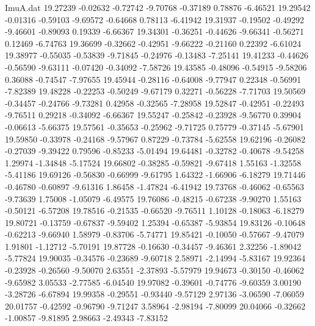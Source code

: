 \begin{filecontents}{ImuA.dat}
  19.27239   -0.02632   -0.72742   -9.70768   -0.37189    0.78876   -6.46521
  19.29542   -0.01316   -0.59103   -9.69572   -0.64668    0.78113   -6.41942
  19.31937   -0.19502   -0.49292   -9.46601   -0.89093    0.19339   -6.66367
  19.34301   -0.36251   -0.44626   -9.66341   -0.56271    0.12469   -6.74763
  19.36699   -0.32662   -0.42951   -9.66222   -0.21160    0.22392   -6.61024
  19.38977   -0.55035   -0.53839   -9.71845   -0.24976   -0.13483   -7.25141
  19.41233   -0.44626   -0.56590   -9.63111   -0.07420   -0.34092   -7.58726
  19.43585   -0.48096   -0.54915   -9.58206    0.36088   -0.74547   -7.97655
  19.45944   -0.28116   -0.64008   -9.77947    0.22348   -0.56991   -7.82389
  19.48228   -0.22253   -0.50249   -9.67179    0.32271   -0.56228   -7.71703
  19.50569   -0.34457   -0.24766   -9.73281    0.42958   -0.32565   -7.28958
  19.52847   -0.42951   -0.22493   -9.76511    0.29218   -0.34092   -6.66367
  19.55247   -0.25842   -0.23928   -9.56770    0.39904   -0.06613   -5.66375
  19.57561   -0.35653   -0.25962   -9.71725    0.75779   -0.37145   -5.67901
  19.59850   -0.33978   -0.24168   -9.57967    0.87229   -0.73784   -5.62558
  19.62196   -0.26082   -0.27039   -9.39422    0.79596   -0.85233   -5.01494
  19.64481   -0.32782   -0.40678   -9.54258    1.29974   -1.34848   -5.17524
  19.66802   -0.38285   -0.59821   -9.67418    1.55163   -1.32558   -5.41186
  19.69126   -0.56830   -0.66999   -9.61795    1.64322   -1.66906   -6.18279
  19.71446   -0.46780   -0.60897   -9.61316    1.86458   -1.47824   -6.41942
  19.73768   -0.46062   -0.65563   -9.73639    1.75008   -1.05079   -6.49575
  19.76086   -0.48215   -0.67238   -9.90270    1.55163   -0.50121   -6.57208
  19.78516   -0.21535   -0.66520   -9.76511    1.10128   -0.18063   -6.18279
  19.80721   -0.13759   -0.67837   -9.59402    1.25394   -0.65387   -5.93854
  19.83126   -0.10648   -0.62213   -9.66940    1.58979   -0.83706   -5.74771
  19.85421   -0.10050   -0.57667   -9.47079    1.91801   -1.12712   -5.70191
  19.87728   -0.16630   -0.34457   -9.46361    2.32256   -1.89042   -5.77824
  19.90035   -0.34576   -0.23689   -9.60718    2.58971   -2.14994   -5.83167
  19.92364   -0.23928   -0.26560   -9.50070    2.63551   -2.37893   -5.57979
  19.94673   -0.30150   -0.46062   -9.65982    3.05533   -2.77585   -6.04540
  19.97082   -0.39601   -0.74776   -9.60359    3.00190   -3.28726   -6.67894
  19.99358   -0.29551   -0.93440   -9.57129    2.97136   -3.06590   -7.06059
  20.01757   -0.42592   -0.96790   -9.71247    3.58964   -2.98194   -7.80099
  20.04066   -0.32662   -1.00857   -9.81895    2.98663   -2.49343   -7.83152

\end{filecontents}
